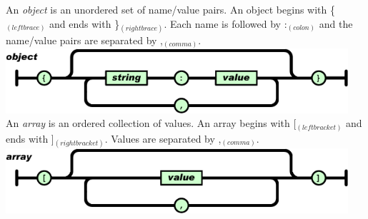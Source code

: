\documentclass[11pt,twoside,a4paper]{article}
\begin{document}
	An \emph{object} is an unordered set of name/value pairs. An object begins with \{$_{(left brace)}$ and ends with \}$_{(right brace)}$. Each name is followed by :$_{(colon)}$ and the name/value pairs are separated by ,$_{(comma)}$.~\\
	
	\includegraphics[width=0.95\textwidth]{img/object.png}~\\
	
	An \emph{array} is an ordered collection of values. An array begins with [$_{(left bracket)}$ and ends with ]$_{(right bracket)}$. Values are separated by ,$_{(comma)}$.~\\
	
	\includegraphics[width=0.95\textwidth]{img/array.png}~\\
\end{document}
